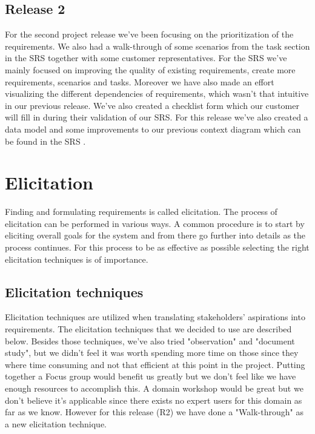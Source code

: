 \documentclass[10pt]{article}
\begin{document}
\subsection{Release 2}
For the second project release we've been focusing on the prioritization of the requirements. We also had a walk-through of some scenarios from the task section in the SRS together with some customer representatives. For the SRS we've mainly focused on improving the quality of existing requirements, create more requirements, scenarios and tasks. Moreover we have also made an effort visualizing the different dependencies of requirements, which wasn't that intuitive in our previous release. We've also created a checklist form which our customer will fill in during their validation of our SRS.
For this release we've also created a data model and some improvements to our previous context diagram which can be found in the SRS \cite{srs}.

\section{Elicitation}
\sloppy
\noindent Finding and formulating requirements is called elicitation. The process of elicitation can be performed in various ways. A common procedure is to start by eliciting overall goals for the system and from there go further into details as the process continues. For this process to be as effective as possible selecting the right elicitation techniques is of importance.

\subsection{Elicitation techniques}
Elicitation techniques are utilized when translating stakeholders' aspirations into requirements.
The elicitation techniques that we decided to use are described below.
Besides those techniques, we've also tried "observation" and "document study", but we didn't feel it was worth spending more time on those since they where time consuming and not that efficient at this point in the project.
Putting together a Focus group would benefit us greatly but we don’t feel like we have enough resources to accomplish this.
A domain workshop would be great but we don't believe it's applicable since there exists no expert users for this domain as far as we know.
However for this release (R2) we have done a "Walk-through" as a new elicitation technique.
\end{document}
